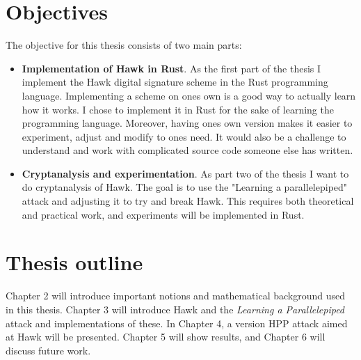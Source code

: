\section{Objectives}
The objective for this thesis consists of two main parts:
\begin{itemize}
\item \textbf{Implementation of Hawk in Rust}. As the first part of the thesis I implement the Hawk digital signature scheme in the Rust programming language. 
    Implementing a scheme on ones own is a good way to actually learn how it works. I chose to implement it in Rust for the sake of learning the programming language.
    Moreover, having ones own version makes it easier to experiment, adjust and modify to ones need. It would also be a challenge to understand and work with complicated source code someone else has written.

\item \textbf{Cryptanalysis and experimentation}. As part two of the thesis I want to do cryptanalysis of Hawk. The goal is to use the "Learning a parallelepiped" attack \cite{NR09} and adjusting it to try and break Hawk. 
    This requires both theoretical and practical work, and experiments will be implemented in Rust.
\end{itemize}
\section{Thesis outline}
Chapter 2 will introduce important notions and mathematical background used in this thesis. Chapter 3 will introduce Hawk and the \textit{Learning a Parallelepiped} attack and implementations of these. 
In Chapter 4, a version HPP attack aimed at Hawk will be presented. Chapter 5 will show results, and Chapter 6 will discuss future work.
